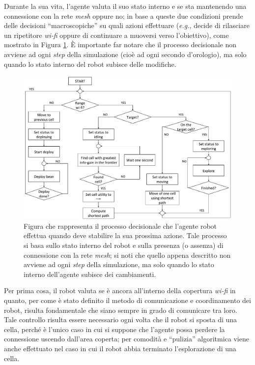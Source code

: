 Durante la sua vita, l'agente valuta il suo stato interno e se sta mantenendo una connessione con la rete \textit{mesh} oppure no; in base a queste due condizioni prende delle decisioni “macroscopiche” su quali azioni effettuare (\textit{e.g.}, decide di rilasciare un ripetitore \textit{wi-fi} oppure di continuare a muoversi verso l'obiettivo), come mostrato in Figura \ref{fig:robotworkflow}.
È importante far notare che il processo decisionale non avviene ad ogni \textit{step} della simulazione (cioè ad ogni secondo d'orologio), ma solo quando lo stato interno del robot subisce delle modifiche.
\begin{figure}
	\centering
	\includegraphics[width=1.0\linewidth]{images/Robot_workflow}
	\caption{Figura che rappresenta il processo decisionale che l'agente robot effettua quando deve stabilire la sua prossima azione. Tale processo si basa sullo stato interno del robot e sulla presenza (o assenza) di connessione con la rete \textit{mesh}; si noti che quello appena descritto non avviene ad ogni \textit{step} della simulazione, ma solo quando lo stato interno dell'agente subisce dei cambiamenti.}
	\label{fig:robotworkflow}
\end{figure}
Per prima cosa, il robot valuta se è ancora all'interno della copertura \textit{wi-fi} in quanto, per come è stato definito il metodo di comunicazione e coordinamento dei robot, risulta fondamentale che siano sempre in grado di comunicare tra loro.
Tale controllo risulta essere necessario ogni volta che il robot si sposta di una cella, perché è l'unico caso in cui si suppone che l'agente possa perdere la connessione uscendo dall'area coperta; per comodità e “pulizia” algoritmica viene anche effettuato nel caso in cui il robot abbia terminato l'esplorazione di una cella.
